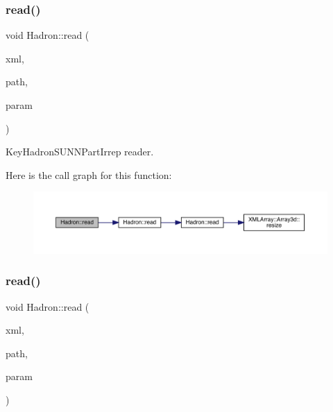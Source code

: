 \subsubsection{\texorpdfstring{read()}{read()}\hspace{0.1cm}{\footnotesize\ttfamily [8/94]}}
{\footnotesize\ttfamily void Hadron\+::read (\begin{DoxyParamCaption}\item[{\mbox{\hyperlink{classADATXML_1_1XMLReader}{X\+M\+L\+Reader}} \&}]{xml,  }\item[{const std\+::string \&}]{path,  }\item[{\mbox{\hyperlink{structHadron_1_1KeyHadronSUNNPartIrrep__t}{Key\+Hadron\+S\+U\+N\+N\+Part\+Irrep\+\_\+t}} \&}]{param }\end{DoxyParamCaption})}



Key\+Hadron\+S\+U\+N\+N\+Part\+Irrep reader. 

Here is the call graph for this function\+:
\nopagebreak
\begin{figure}[H]
\begin{center}
\leavevmode
\includegraphics[width=350pt]{d1/daf/namespaceHadron_a4cc74936761dd0dad429189f523b1432_cgraph}
\end{center}
\end{figure}
\mbox{\label{namespaceHadron_a9e39323c40f07b97b83923c9bfd452b3}} 
\subsubsection{\texorpdfstring{read()}{read()}\hspace{0.1cm}{\footnotesize\ttfamily [9/94]}}
{\footnotesize\ttfamily void Hadron\+::read (\begin{DoxyParamCaption}\item[{\mbox{\hyperlink{classADATXML_1_1XMLReader}{X\+M\+L\+Reader}} \&}]{xml,  }\item[{const std\+::string \&}]{path,  }\item[{\mbox{\hyperlink{structHadron_1_1KeyHadronNPartIrrep__t}{Key\+Hadron\+N\+Part\+Irrep\+\_\+t}} \&}]{param }\end{DoxyParamCaption})}



